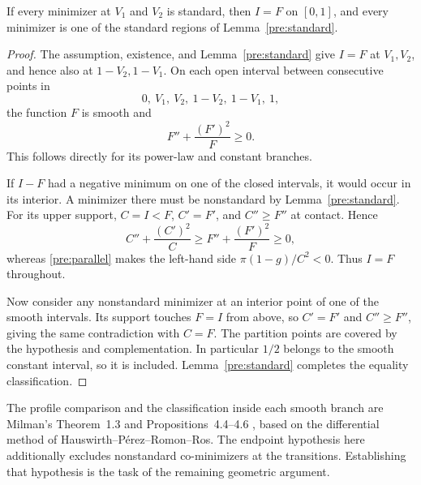 \begin{proposition}\label{pre:reduction}
If every minimizer at \(V_1\) and \(V_2\) is standard, then
\(I=F\) on \([0,1]\), and every minimizer is one of the standard regions
of Lemma~\ref{pre:standard}.
\end{proposition}

\begin{proof}
The assumption, existence, and Lemma~\ref{pre:standard} give \(I=F\) at
\(V_1,V_2\), and hence also at \(1-V_2,1-V_1\).
On each open interval between consecutive points in
\[
 0,\ V_1,\ V_2,\ 1-V_2,\ 1-V_1,\ 1,
\]
the function \(F\) is smooth and
\begin{equation}
 F''+\frac{(F')^2}{F}\ge0.
 \label{pre:branch-ode}
\end{equation}
This follows directly for its power-law and constant branches.

If \(I-F\) had a negative minimum on one of the closed intervals,
it would occur in its interior. A minimizer there must be nonstandard
by Lemma~\ref{pre:standard}. For its upper support,
\(C=I<F\), \(C'=F'\), and \(C''\ge F''\) at contact. Hence
\[
 C''+\frac{(C')^2}{C}
       \ge F''+\frac{(F')^2}{F}\ge0,
\]
whereas \eqref{pre:parallel} makes the left-hand side
\(\pi(1-g)/C^2<0\). Thus \(I=F\) throughout.

Now consider any nonstandard minimizer at an interior point of one of
the smooth intervals. Its support touches \(F=I\) from above, so
\(C'=F'\) and \(C''\ge F''\), giving the same contradiction with \(C=F\).
The partition points are covered by the hypothesis and complementation.
In particular \(1/2\) belongs to the smooth constant interval, so it is
included. Lemma~\ref{pre:standard} completes the equality classification.
\end{proof}

The profile comparison and the classification inside each smooth branch
are Milman's Theorem~1.3 and Propositions~4.4--4.6 \cite{Milman}, based
on the differential method of Hauswirth--P\'erez--Romon--Ros.
The endpoint hypothesis here additionally excludes nonstandard
co-minimizers at the transitions. Establishing that hypothesis is the
task of the remaining geometric argument.
